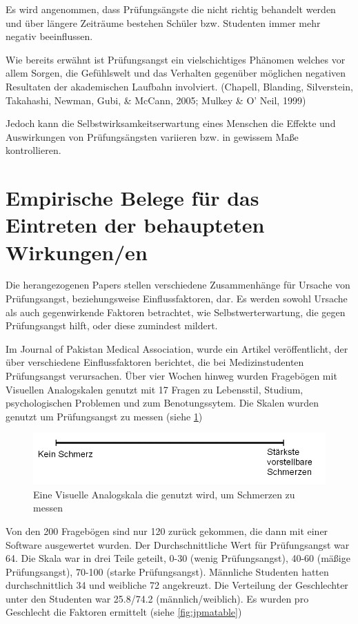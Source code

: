 \documentclass[11pt, a4paper]{article}
\begin{document}
Es wird angenommen, dass Prüfungsängste die nicht richtig behandelt werden und über längere Zeiträume bestehen Schüler bzw. Studenten immer mehr negativ beeinflussen. 

Wie bereits erwähnt ist Prüfungsangst ein vielschichtiges Phänomen welches vor allem Sorgen, die Gefühlswelt und das Verhalten gegenüber möglichen negativen Resultaten der akademischen Laufbahn involviert. (Chapell, Blanding, Silverstein, Takahashi, Newman, Gubi, \& McCann, 2005; Mulkey \& O’ Neil, 1999)

Jedoch kann die Selbstwirksamkeitserwartung eines Menschen die Effekte und Auswirkungen von Prüfungsängsten variieren bzw. in gewissem Maße kontrollieren. \cite{barrows2013anxiety}

\newpage
\section*{Empirische Belege für das Eintreten der behaupteten Wirkungen/en}

	Die herangezogenen Papers stellen verschiedene Zusammenhänge für Ursache von\\ Prüfungsangst, beziehungsweise Einflussfaktoren, dar. Es werden sowohl Ursache als auch gegenwirkende Faktoren betrachtet, wie Selbstwerterwartung, die gegen Prüfungsangst hilft, oder diese zumindest mildert.

	Im Journal of Pakistan Medical Association, wurde ein Artikel veröffentlicht, der über verschiedene Einflussfaktoren berichtet, die bei Medizinstudenten Prüfungsangst verursachen. Über vier Wochen hinweg wurden Fragebögen mit Visuellen Analogskalen genutzt mit 17 Fragen zu Lebensstil, Studium, psychologischen Problemen und zum Benotungssytem. Die Skalen wurden genutzt um Prüfungsangst zu messen (siehe \cref{fig:vas}) \cite{hashmat2008factors}

	\begin{figure}[p]
		\centering
		\includegraphics{img/VAS.png}
		\caption{Eine Visuelle Analogskala die genutzt wird, um Schmerzen zu messen \cite{hashmat2008factors}}
		\label{fig:vas}
	\end{figure}

	Von den 200 Fragebögen sind nur 120 zurück gekommen, die dann mit einer Software ausgewertet wurden. Der Durchschnittliche Wert für Prüfungsangst war 64. Die Skala war in drei Teile geteilt, 0-30 (wenig Prüfungsangst), 40-60 (mäßige Prüfungsangst), 70-100 (starke Prüfungsangst). Männliche Studenten hatten durchschnittlich 34 und weibliche 72 angekreuzt. Die Verteilung der Geschlechter unter den Studenten war 25.8/74.2 (männlich/weiblich). Es wurden pro Geschlecht die Faktoren ermittelt (siehe \cref{fig:jpmatable}) \cite{hashmat2008factors}
\end{document}
